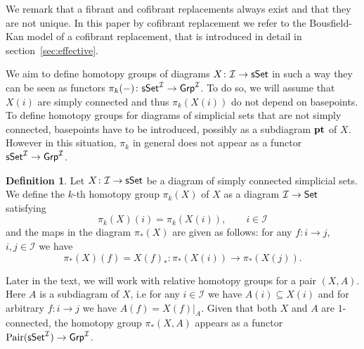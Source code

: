 \documentclass[12pt,a4wide]{article}
\theoremstyle{plain}
\theoremstyle{definition}
\newtheorem{Def}[thm]{Definition}
\newcommand{\pt}{ \mathrm{\bf pt}}
\newcommand{\heading}[1]{\vspace{1ex}\par\noindent{\bf\boldmath #1}}
\newcommand{\Grp}{\mathsf{Grp}}
\newcommand{\thedimm}{{k}}
\renewcommand\:{\colon}
\newcommand{\dX}{X}
\newcommand{\dA}{A}
\newcommand{\dpi}{\pi}
\newcommand{\icat}{\mathcal I}
\begin{document}
We remark that a fibrant and cofibrant replacements always exist and that they are not unique. In this paper by cofibrant replacement we refer to the Bousfield-Kan model of a cofibrant replacement, that is introduced in detail in section~\ref{sec:effective}.
\heading{Homotopy and homology}




We aim to define homotopy groups of diagrams $\dX \: \icat \to \sSet$ in such a way they can be seen as functors $\dpi_\thedimm (-)\:\sSet^\icat \to \Grp^\icat$. To do so, we will assume that $\dX(i)$ are simply connected and thus  $\pi_\thedimm (\dX(i))$ do not depend on  basepoints.
To define homotopy groups for diagrams of simplicial sets that are not simply connected, basepoints have to be introduced, possibly as a subdiagram  $\pt$ of $\dX$. However in this situation, $\dpi_k$  in general does not appear as a  functor $\sSet^\icat \to \Grp^\icat$. 

\begin{Def}
Let  $\dX \colon \icat \to \sSet$ be a diagram of simply connected simplicial sets. We define the $\thedimm$-th  homotopy group $\dpi_\thedimm (\dX) $ of $\dX$ as a diagram $\icat \to \Set$ satisfying
\[
\dpi_\thedimm (\dX) (i) = \pi_\thedimm (\dX(i)), \qquad i\in \icat
\]
and the maps in the diagram $\dpi_* (\dX)$ are given as follows: for any $f\: i\to j$, $i,j \in \icat$ we have 
\[
\dpi_* (\dX) (f) = \dX(f)_* \:  \pi_* (\dX(i)) \to  \pi_* (\dX(j)).
\]
\end{Def}
Later in the text, we will work with relative homotopy groups for a pair $(\dX, \dA)$. Here $\dA$ is a subdiagram of $\dX$, i.e for any $i\in \icat$ we have $\dA (i) \subseteq \dX (i)$ and for arbitrary $f\: i \to j$ we have $\dA(f) = \dX(f)|_{\dA}$. Given that both $\dX$ and $\dA$ are $1$-connected, the homotopy group $\dpi_*(\dX, \dA)$ appears as a functor $\mathrm{Pair}( \sSet^\icat) \to \Grp^\icat$.
\end{document}
